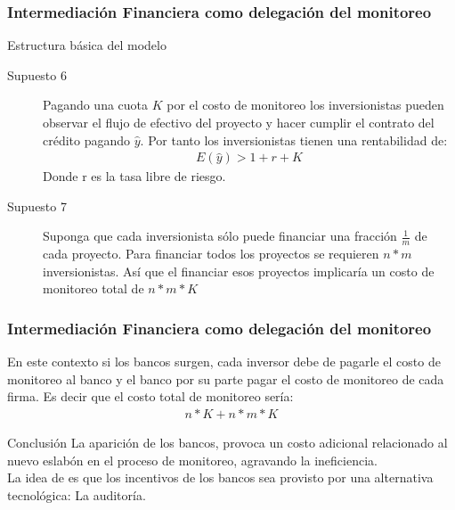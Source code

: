 \begin{frame}
    \frametitle{{\normalsize Intermediación Financiera como delegación del monitoreo} {}}
    
     \begin{block} {Estructura básica del modelo}
        \begin{description}
            \item[Supuesto 6] Pagando una cuota $K$ por el costo de monitoreo los inversionistas pueden observar el flujo de efectivo del proyecto y hacer cumplir el contrato del crédito pagando $\hat{y} $. Por tanto los inversionistas tienen una rentabilidad de:
            \begin{align}
            E(\hat{y})>1+r+K
            \end{align}
            Donde r es la tasa libre de riesgo.
            \item[Supuesto 7] Suponga que cada inversionista sólo puede financiar una fracción $\frac{1}{m}$ de cada proyecto. Para financiar todos los proyectos se requieren $n*m$ inversionistas. Así que el financiar esos proyectos implicaría un costo de monitoreo total de $ n*m*K$
           \end{description}
       
      
       
     \end{block}	
 

 

\end{frame}


\begin{frame}
    \frametitle{{\normalsize Intermediación Financiera como delegación del monitoreo} {}}
   
    En este contexto si los bancos surgen, cada inversor debe de pagarle el costo de monitoreo al banco y el banco por su parte pagar el costo de monitoreo de cada firma. Es decir que el costo total de monitoreo sería:
    \begin{align}
    n*K+n*m*K
    \end{align}
     \begin{block} {Conclusión}
     La aparición de los bancos, provoca un costo adicional relacionado al nuevo eslabón en el proceso de monitoreo, agravando la ineficiencia. \\
     La idea de \cite{Diamond1984} es que los incentivos de los bancos sea provisto por una alternativa tecnológica: La auditoría.   
    \end{block}
    
    
   
\end{frame}


